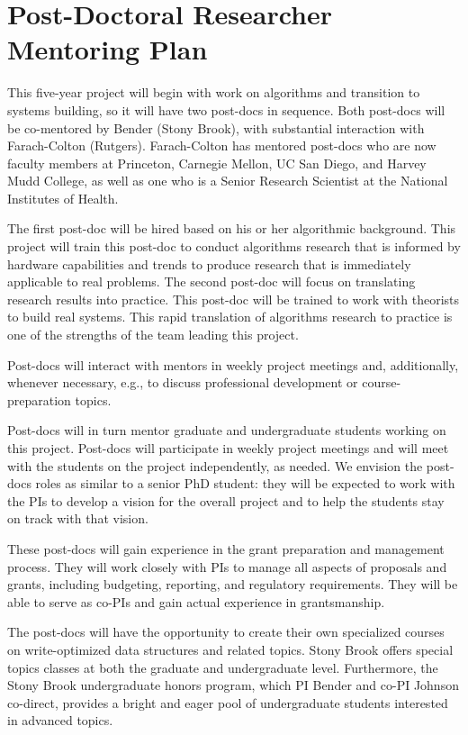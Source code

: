 
\section*{Post-Doctoral Researcher Mentoring Plan}
\label{postdoc}



This five-year project will begin with work on algorithms and
transition to systems building, so it will have two post-docs in
sequence.  Both post-docs will be co-mentored by Bender (Stony Brook),
with substantial interaction with Farach-Colton (Rutgers).  Farach-Colton has
mentored post-docs who are now faculty members at Princeton, Carnegie
Mellon, UC San Diego, and Harvey Mudd College, as well as one who is a
Senior Research Scientist at the National Institutes of Health.

The first post-doc will be hired based on his or her algorithmic
background.  This project will train this post-doc to conduct
algorithms research that is informed by hardware capabilities and
trends to produce research that is immediately applicable to real
problems.  The second post-doc will focus on translating research
results into practice.  This post-doc will be trained to work with
theorists to build real systems.  This rapid translation of algorithms
research to practice is one of the strengths of the team leading this
project.

Post-docs will interact with mentors in weekly project meetings
and, additionally,  whenever  necessary, e.g., to discuss professional development or course-preparation topics.

Post-docs will in turn mentor graduate and undergraduate students
working on this project.  Post-docs will participate in weekly project
meetings and will meet with the students on the project independently,
as needed.  We envision the post-docs roles as similar to a senior PhD
student: they will be expected to work with the PIs to develop a
vision for the overall project and to help the students stay on track
with that vision. 

These post-docs will gain experience in the grant preparation and
management process.  They will work closely with PIs to manage all
aspects of proposals and grants, including budgeting, reporting, and
regulatory requirements. They will be able to serve as co-PIs and
gain actual experience in grantsmanship.

The post-docs will have the opportunity to create their own
specialized courses on write-optimized data structures and related
topics.  Stony Brook offers special topics classes at both the
graduate and undergraduate level.  Furthermore, the Stony Brook
undergraduate 
honors program, which PI Bender and co-PI Johnson co-direct, provides
a bright and eager pool of undergraduate students interested in
advanced topics.

